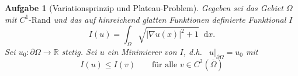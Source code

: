 \documentclass{scrartcl}
\newcommand{\abs}[1]{\left\lvert #1 \right\rvert}
\newcommand{\restr}[2]{\left. #1 \right|_{#2}}
\newcommand{\intd}{\mathop{} \mathrm{d}}
\newcommand{\Rand}[1]{\partial #1}
\newcommand{\reals}{\mathbb{R}}
\newcommand{\closure}[1]{\overline{#1}}
\newtheorem {problem} {Aufgabe}
\begin{document}
\begin{problem}[Variationsprinzip und Plateau-Problem]
  Gegeben sei das Gebiet
  $\Omega$ mit
  $C^1\text{-Rand}$ und das auf hinreichend glatten Funktionen definierte Funktional $I$
  \begin{equation}
    I(u) = \int_{\Omega}
    \sqrt
    { \abs{ \nabla u (x) } ^ 2 + 1}
    \intd x.
  \end{equation}
  Sei $u_0 \colon \Rand{\Omega} \to
  \reals$ stetig.
  Sei $u$ ein Minimierer von $I$, d.h.\ 
  $\restr{u}{\Rand {\Omega}} = u_0$ mit
  \begin{equation}
    I(u) \leq I(v)
    \qquad
    \text{für alle } v
    \in
    C^2(\closure{\Omega})

\end{equation}
\end{problem}
\end{document}
